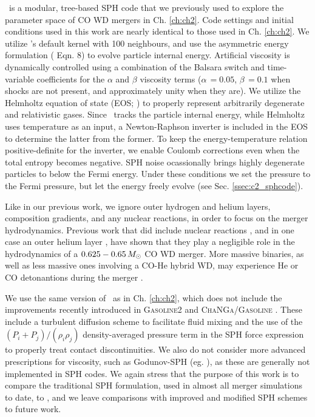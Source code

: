 \gasoline\ is a modular, tree-based SPH code that we previously used to explore the parameter space of CO WD mergers in Ch. \ref{ch:ch2}.  Code settings and initial conditions used in this work are nearly identical to those used in Ch. \ref{ch:ch2}.  We utilize \gasoline's default \cite{hernk89} kernel with 100 neighbours, and use the asymmetric energy formulation (\citeauthor{wadssq04} Eqn. 8) to evolve particle internal energy.  Artificial viscosity is dynamically controlled using a combination of the Balsara switch and time-variable coefficients for the $\alpha$ and $\beta$ viscosity terms ($\alpha\,=0.05$, $\beta\,=0.1$ when shocks are not present, and approximately unity when they are).  We utilize the Helmholtz equation of state (EOS; \citealt{timms00}) to properly represent arbitrarily degenerate and relativistic gases.  Since \gasoline\ tracks the particle internal energy, while Helmholtz uses temperature as an input, a Newton-Raphson inverter is included in the EOS to determine the latter from the former.  To keep the energy-temperature relation positive-definite for the inverter, we enable Coulomb corrections even when the total entropy becomes negative.  SPH noise ocassionally brings highly degenerate particles to below the Fermi energy.  Under these conditions we set the pressure to the Fermi pressure, but let the energy freely evolve (see Sec. \ref{ssec:c2_sphcode}).

Like in our previous work, we ignore outer hydrogen and helium layers, composition gradients, and any nuclear reactions, in order to focus on the merger hydrodynamics.  Previous work that did include nuclear reactions \citep{loreig09,dan+12}, and in one case an outer helium layer \citep{rask+12}, have shown that they play a negligible role in the hydrodynamics of a $0.625 - 0.65\,\Msun$ CO WD merger.  More massive binaries, as well as less massive ones involving a CO-He hybrid WD, may experience He or CO detonantions during the merger \citep{pakm+10, rask+12, dan+12, pakm+13}.

We use the same version of \gasoline\ as in Ch. \ref{ch:ch2}, which does not include the improvements recently introduced in \textsc{Gasoline2} \citep{kell+15, tamb+15} and \textsc{ChaNGa/Gasoline} \citep{gove+15}.  These include a turbulent diffusion scheme to facilitate fluid mixing \citep{shen+10} and the use of the $(P_i + P_j)/(\rho_i\rho_j)$ density-averaged pressure term in the SPH force expression \citep{kell+14} to properly treat contact discontinuities.  We also do not consider more advanced prescriptions for viscosity, such as Godunov-SPH (eg. \citealt{chaw16}), as these are generally not implemented in SPH codes.  We again stress that the purpose of this work is to compare the traditional SPH formulation, used in almost all merger simulations to date, to \arepo, and we leave comparisons with improved and modified SPH schemes to future work.

